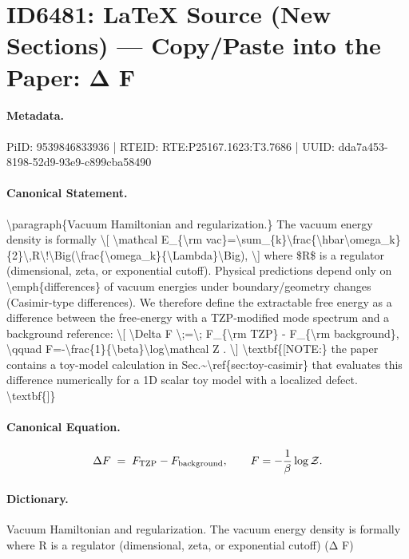 \section*{ID6481: LaTeX Source (New Sections) — Copy/Paste into the Paper: Δ F}
\paragraph{Metadata.}
PiID: 9539846833936 | RTEID: RTE:P25167.1623:T3.7686 | UUID: dda7a453-8198-52d9-93e9-c899cba58490

\paragraph{Canonical Statement.}
\textbackslash{}paragraph\{Vacuum Hamiltonian and regularization.\} The vacuum energy density is formally \textbackslash{}[ \textbackslash{}mathcal E\_\{\textbackslash{}rm vac\}=\textbackslash{}sum\_\{k\}\textbackslash{}frac\{\textbackslash{}hbar\textbackslash{}omega\_k\}\{2\}\textbackslash{},R\textbackslash{}!\textbackslash{}Big(\textbackslash{}frac\{\textbackslash{}omega\_k\}\{\textbackslash{}Lambda\}\textbackslash{}Big), \textbackslash{}] where \$R\$ is a regulator (dimensional, zeta, or exponential cutoff). Physical predictions depend only on \textbackslash{}emph\{differences\} of vacuum energies under boundary/geometry changes (Casimir-type differences). We therefore define the extractable free energy as a difference between the free-energy with a TZP-modified mode spectrum and a background reference: \textbackslash{}[ \textbackslash{}Delta F \textbackslash{};=\textbackslash{}; F\_\{\textbackslash{}rm TZP\} - F\_\{\textbackslash{}rm background\}, \textbackslash{}qquad F=-\textbackslash{}frac\{1\}\{\textbackslash{}beta\}\textbackslash{}log\textbackslash{}mathcal Z . \textbackslash{}] \textbackslash{}textbf\{[NOTE:\} the paper contains a toy-model calculation in Sec.\textasciitilde{}\textbackslash{}ref\{sec:toy-casimir\} that evaluates this difference numerically for a 1D scalar toy model with a localized defect. \textbackslash{}textbf\{]\}

\paragraph{Canonical Equation.}
\[
\Delta F \;=\; F_{\rm TZP} - F_{\rm background}, \qquad F=-\frac{1}{\beta}\log\mathcal Z .
\]

\paragraph{Dictionary.}
Vacuum Hamiltonian and regularization. The vacuum energy density is formally where R is a regulator (dimensional, zeta, or exponential cutoff) (Δ F)

